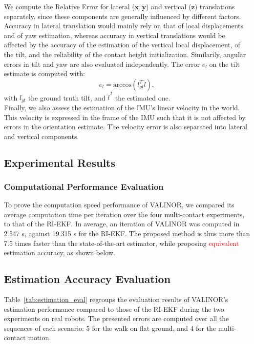 \documentclass{IJCAS}
\begin{document}
We compute the Relative Error for lateral ($\boldsymbol{x}, \boldsymbol{y}$) and vertical ($\boldsymbol{z}$) translations separately, since these components are generally influenced by different factors. Accuracy in lateral translation would mainly rely on that of local displacements and of yaw estimation, whereas accuracy in vertical translations would be affected by the accuracy of the estimation of the vertical local displacement, of the tilt, and the reliability of the contact height initialization. Similarily, angular errors in tilt and yaw are also evaluated independently.
The error $e_{l}$ on the tilt estimate is computed with:
\begin{equation}
    e_{l} = \text{arccos}\left(l_{gt}^{T} \hat{l} \right),
\end{equation}
with $l_{gt}$ the ground truth tilt, and $\hat{l}^{T}$ the estimated one.\\
Finally, we also assess the estimation of the IMU's linear velocity in the world. This velocity is expressed in the frame of the IMU such that it is not affected by errors in the orientation estimate. The velocity error is also separated into lateral and vertical components.

\subsection{Experimental Results}

\subsubsection{Computational Performance Evaluation}\label{subsec:computation_time}

To prove the computation speed performance of VALINOR, we compared its average computation time per iteration over the four multi-contact experiments, to that of the RI-EKF. In average, an iteration of VALINOR was computed in 2.547 \textmu s, against 19.315 \textmu s for the RI-EKF. The proposed method is thus more than 7.5 times faster than the state-of-the-art estimator, while proposing \textcolor{red}{equivalent} estimation accuracy, as shown below.

\subsection{Estimation Accuracy Evaluation}

Table~\ref{tab:estimation_eval} regroups the evaluation results of VALINOR's estimation performance compared to those of the RI-EKF during the two experiments on real robots.
The presented errors are computed over all the sequences of each scenario: 5 for the walk on flat ground, and 4 for the multi-contact motion.
\end{document}

